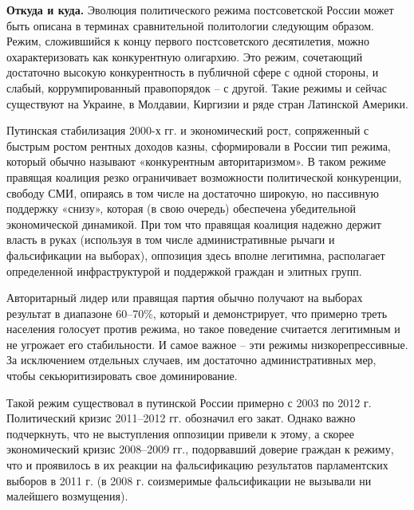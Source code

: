 \textbf{Откуда и куда.}
Эволюция политического режима постсоветской России может быть описана в терминах сравнительной политологии следующим образом. Режим, сложившийся к концу первого постсоветского десятилетия, можно охарактеризовать как конкурентную олигархию. Это режим, сочетающий достаточно высокую конкурентность в публичной сфере с одной стороны, и слабый, коррумпированный правопорядок – с другой. Такие режимы и сейчас существуют на Украине, в Молдавии, Киргизии и ряде стран Латинской Америки.

Путинская стабилизация 2000-х гг. и экономический рост, сопряженный с быстрым ростом рентных доходов казны, сформировали в России тип режима, который обычно называют «конкурентным авторитаризмом». В таком режиме правящая коалиция резко ограничивает возможности политической конкуренции, свободу СМИ, опираясь в том числе на достаточно широкую, но пассивную поддержку «снизу», которая (в свою очередь) обеспечена убедительной экономической динамикой. При том что правящая коалиция надежно держит власть в руках (используя в том числе административные рычаги и фальсификации на выборах), оппозиция здесь вполне легитимна, располагает определенной инфраструктурой и поддержкой граждан и элитных групп.

Авторитарный лидер или правящая партия обычно получают на выборах результат в диапазоне 60–70\%, который и демонстрирует, что примерно треть населения голосует против режима, но такое поведение считается легитимным и не угрожает его стабильности. И самое важное – эти режимы низкорепрессивные. За исключением отдельных случаев, им достаточно административных мер, чтобы секьюритизировать свое доминирование.

Такой режим существовал в путинской России примерно с 2003 по 2012 г. Политический кризис 2011–2012 гг. обозначил его закат. Однако важно подчеркнуть, что не выступления оппозиции привели к этому, а скорее экономический кризис 2008–2009 гг., подорвавший доверие граждан к режиму, что и проявилось в их реакции на фальсификацию результатов парламентских выборов в 2011 г. (в 2008 г. соизмеримые фальсификации не вызывали ни малейшего возмущения).

